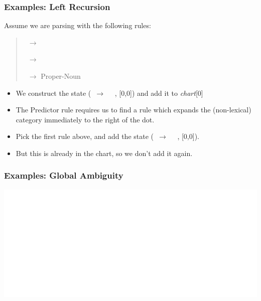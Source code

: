 \begin{frame}[fragile]
  \frametitle{Examples: Left Recursion}


Assume we are parsing \NP {}
with the following rules:
\begin{quote}
  \NP\ $\rightarrow$ \NP\ \PP

  \NP\ $\rightarrow$ \Det\ \Nom

  \NP\ $\rightarrow$ Proper-Noun

\end{quote}

\begin{itemize}
  \item We construct the state (\NP\ $\rightarrow$ \bigdot\ \NP\ \PP,
    [0,0]) and add it to \textit{chart}[0]
  \item The Predictor rule  requires us to find a rule
    which expands the (non-lexical) category immediately to the right of
    the dot. 
  \item Pick the first rule above, and add the
    state (\NP\ $\rightarrow$ \bigdot\ \NP\ \PP, [0,0]).
  \item But this is already in the chart, so we don't add it again. 
\end{itemize}



\end{frame}


\begin{frame}[fragile]
 \frametitle{Examples: Global Ambiguity}

\includegraphics[scale=.6]{../images/oldmen.pdf}


\end{frame}

